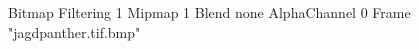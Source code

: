 {Bitmap
	{Filtering 1}
	{Mipmap 1}
	{Blend none}
	{AlphaChannel 0}
	{Frame "jagdpanther.tif.bmp"}
}

